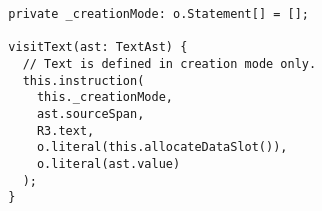 \begin{verbatim}
  private _creationMode: o.Statement[] = [];

  visitText(ast: TextAst) {
    // Text is defined in creation mode only.
    this.instruction(
      this._creationMode,
      ast.sourceSpan,
      R3.text,
      o.literal(this.allocateDataSlot()),
      o.literal(ast.value)
    );
  }
\end{verbatim}
